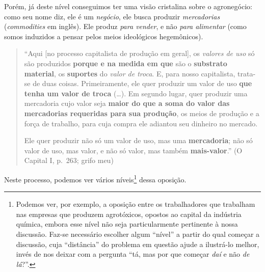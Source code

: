 Porém, já deste nível conseguimos ter uma visão cristalina sobre o
agronegócio: como seu nome diz, ele é um \textit{negócio}, ele busca
produzir \textit{mercadorias} (\textit{commodities} em inglês). Ele
produz \textit{para vender}, e não \textit{para alimentar} (como somos
induzidos a pensar pelos meios ideológicos hegemônicos).

\begin{quote}
``Aqui {[}no processo capitalista de produção em geral{]}, os
\textit{valores de uso} só são produzidos
\textbf{porque e na medida em que} são o \textbf{substrato material}, os
\textbf{suportes} do \textit{valor de troca}. E, para nosso capitalista,
trata-se de duas coisas. Primeiramente, ele quer produzir um valor de
uso \textbf{que tenha um valor de troca} (\ldots). Em segundo lugar,
quer produzir uma mercadoria cujo valor seja
\textbf{maior do que a soma do valor das mercadorias requeridas para sua produção},
os meios de produção e a força de trabalho, para cuja compra ele
adiantou seu dinheiro no mercado.

Ele quer produzir não só um valor de uso, mas uma \textbf{mercadoria};
não só valor de uso, mas valor, e não só valor, mas também
\textbf{mais-valor}.'' (O Capital I, p.~263; grifo meu)
\end{quote}

Neste processo, podemos ver vários níveis\footnote{Podemos ver, por
  exemplo, a oposição entre os trabalhadores que trabalham nas empresas
  que produzem agrotóxicos, opostos ao capital da indústria química,
  embora esse nível não seja particularmente pertinente à nossa
  discussão. Faz-se necessário escolher algum ``nível'' a partir do qual
  começar a discussão, cuja ``distância'' do problema em questão ajude a
  ilustrá-lo melhor, invés de nos deixar com a pergunta ``tá, mas por
  que começar \textit{daí} e não \textit{de lá}?''.} dessa oposição.

